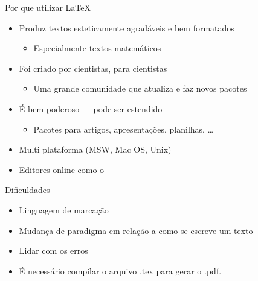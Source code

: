\documentclass{beamer}
\subtitle{Parte 1: O básico}
\begin{document}
\begin{frame}
\titlepage
\end{frame}

\begin{frame}{Por que utilizar \LaTeX}

\begin{itemize}
  \item Produz  textos esteticamente agradáveis e bem formatados
  \begin{itemize}
  \item Especialmente textos matemáticos
\end{itemize}
  \item Foi criado por cientistas, para cientistas
  \begin{itemize}
  \item Uma grande comunidade que atualiza e faz novos pacotes
\end{itemize}
  \item É bem poderoso --- pode ser estendido
  \begin{itemize}
    \item Pacotes para artigos, apresentações, planilhas, \ldots
  \end{itemize}
\item Multi plataforma (MSW, Mac OS, Unix)
\item Editores online como o 
\href{https://www.overleaf.com/signup?ref=9868d6ae68e9}{\wllogo}
\end{itemize}



\begin{block}{Dificuldades}
\begin{itemize}
  \item Linguagem de marcação
  \item Mudança de paradigma em relação a como se escreve um texto
  \item Lidar com os erros
  \item É necessário compilar o arquivo .tex para gerar o .pdf.
\end{itemize}
\end{block}

\end{frame}
\end{document}
